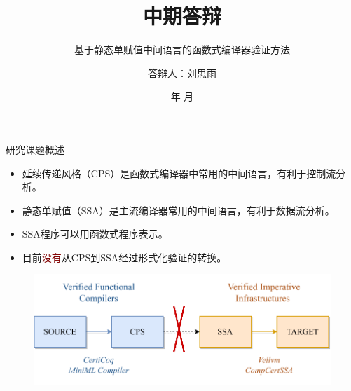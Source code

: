 \documentclass[xcolor=table,dvipsnames,svgnames,aspectratio=169]{ctexbeamer}
\author{答辩人：刘思雨}
\institute[SJTU-PLV]{导师：汪宇霆}
\date{\the\year 年 \the\month 月}
\title[中期答辩] %
{\textbf{中期答辩}} %
\subtitle{基于静态单赋值中间语言的函数式编译器验证方法}
\begin{document}
\AtBeginSection[]{
  \begin{frame}
    \tableofcontents[currentsection,subsectionstyle=show/show/hide]
  \end{frame}
}

\AtBeginSubsection[]{		       %
  \begin{frame}
    \tableofcontents[currentsection,subsectionstyle=show/shaded/hide]
  \end{frame}
}

\maketitle

\begin{frame}{研究课题概述}
  \begin{itemize}
    \item 延续传递风格（CPS）是函数式编译器中常用的中间语言，有利于控制流分析。
    \item 静态单赋值（SSA）是主流编译器常用的中间语言，有利于数据流分析。
    \item SSA程序可以用函数式程序表示。
    \item 目前\textcolor{Maroon}{没有}从CPS到SSA经过形式化验证的转换。
  \end{itemize}
  \begin{figure}
    \centering
    \includegraphics[width=0.7\linewidth]{figures/Motivation.drawio.pdf}
    \label{fig:moti1}
  \end{figure}
\end{frame}
\end{document}
